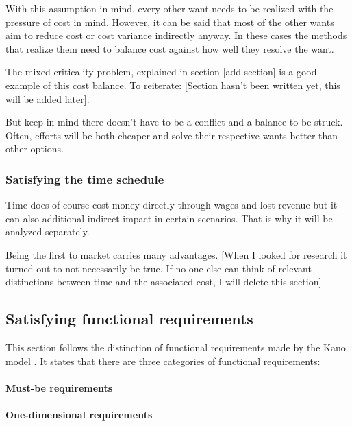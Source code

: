 With this assumption in mind, every other want needs to be realized with the pressure of cost in mind. However, it can be said that most of the other wants aim to reduce cost or cost variance indirectly anyway. In these cases the methods that realize them need to balance cost against how well they resolve the want.

The mixed criticality problem, explained in section [add section] is a good example of this cost balance. To reiterate: [Section hasn't been written yet, this will be added later]. 

But keep in mind there doesn't have to be a conflict and a balance to be struck. Often, efforts will be both cheaper and solve their respective wants better than other options.

\subsubsection{Satisfying the time schedule}
Time does of course cost money directly through wages and lost revenue but it can also additional indirect impact in certain scenarios. That is why it will be analyzed separately.

Being the first to market carries many advantages. [When I looked for research it turned out to not necessarily be true. If no one else can think of relevant distinctions between time and the associated cost, I will delete this section]
\subsection{Satisfying functional requirements}
This section follows the distinction of functional requirements made by the  Kano model \autocite{KanoNoriaki.1984}. 
It states that there are three categories of functional requirements: 
\paragraph{Must-be requirements}  \autocite{ElmarSauerwein.1996}

\paragraph{One-dimensional requirements} \autocite{ElmarSauerwein.1996} 

